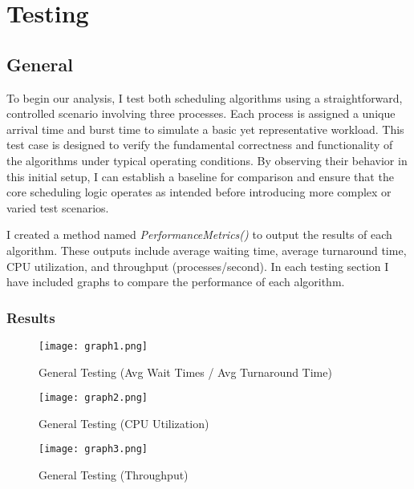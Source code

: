 \documentclass[11pt]{article}
\begin{document}
\section{Testing}
\subsection{General}

To begin our analysis, I test both scheduling algorithms using a straightforward, controlled scenario involving three processes. Each process is assigned a unique arrival time and burst time to simulate a basic yet representative workload. This test case is designed to verify the fundamental correctness and functionality of the algorithms under typical operating conditions. By observing their behavior in this initial setup, I can establish a baseline for comparison and ensure that the core scheduling logic operates as intended before introducing more complex or varied test scenarios.

I created a method named \textit{PerformanceMetrics()} to output the results of each algorithm. These outputs include average waiting time, average turnaround time, CPU utilization, and throughput (processes/second). In each testing section I have included graphs to compare the performance of each algorithm.




\subsubsection{Results}

\begin{figure}[H]
    \centering
    \texttt{[image: graph1.png]}
    \caption{General Testing (Avg Wait Times / Avg Turnaround Time)}
    \label{fig:enter-label}
\end{figure}

\begin{figure}[H]
    \centering
    \texttt{[image: graph2.png]}
    \caption{General Testing (CPU Utilization)}
    \label{fig:enter-label}
\end{figure}

\begin{figure}[H]
    \centering
    \texttt{[image: graph3.png]}
    \caption{General Testing (Throughput)}
    \label{fig:enter-label}
\end{figure}
\end{document}
